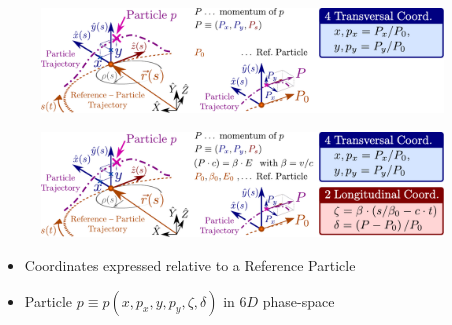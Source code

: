 \documentclass{beamer}
\begin{document}
\begin{frame}
{\begin{figure}[h]
    \end{figure}
}
{
    \begin{figure}[h]
        \centering
        \includegraphics[width=0.95\textwidth]{presentation_images/fig_coordinates_04}
    \end{figure}
}
{
    \begin{figure}[h]
        \centering
        \includegraphics[width=0.95\textwidth]{presentation_images/fig_coordinates_05}
    \end{figure}
}
\begin{itemize}
    \item<4-> Coordinates expressed relative to a {\color{MyDarkOrange}Reference Particle}
    \item<6-> Particle $p \equiv p\left( x, p_x, y, p_y, \zeta, \delta\right)$ in $6D$ phase-space
\end{itemize}
\end{frame}
\end{document}
